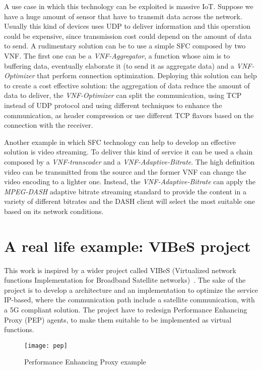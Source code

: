A use case in which this technology can be exploited is massive IoT. Suppose we
have a huge amount of sensor that have to transmit data across the network.
Usually this kind of devices uses UDP to deliver information and this
operation could be expensive, since transmission cost could depend on the amount
of data to send. A rudimentary solution can be to use a simple SFC composed by
two VNF. The first one can be a \emph{VNF-Aggregator}, a function whose aim is
to buffering data, eventually elaborate it (to send it as aggregate data) and a
\emph{VNF-Optimizer} that perform connection optimization. Deploying this
solution can help to create a cost effective solution: the aggregation of data
reduce the amount of data to deliver, the \emph{VNF-Optimizer} can split the
communication, using TCP instead of UDP protocol and using different techniques
to enhance the communication, as header compression or use different TCP
flavors based on the connection with the receiver.

Another example in which SFC technology can help to develop an effective
solution is video streaming. To deliver this kind of service it can be used a
chain composed by a \emph{VNF-transcoder} and a \emph{VNF-Adaptive-Bitrate}. The
high definition video can be transmitted from the source and the former VNF
can change the video encoding to a lighter one. Instead, the
\emph{VNF-Adaptive-Bitrate} can apply the \emph{MPEG-DASH} adaptive bitrate
streaming standard to provide the content in a variety of different bitrates and
the DASH client will select the most suitable one based on its network
conditions.

\section{A real life example: VIBeS project}
This work is inspired by a wider project called VIBeS (Virtualized network
functions Implementation for Broadband Satellite networks)~\cite{vibesesa}. The
sake of the project is to develop a architecture and an implementation to
optimize the service IP-based, where the communication path include a satellite
communication, with a 5G compliant solution. The project have to redesign
Performance Enhancing Proxy (PEP) agents, to make them suitable to be
implemented as virtual functions. 

\begin{figure}[ht]
  \centering
  \texttt{[image: pep]}
  \caption[Performance Enhancing Proxy example]{Performance Enhancing Proxy
  example}
  \label{chap:background:img:pep}
\end{figure}

